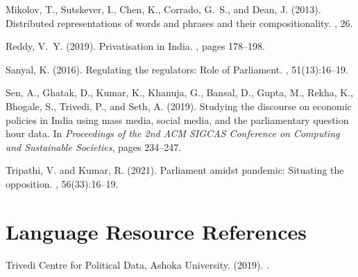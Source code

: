\documentclass[10pt, a4paper]{article}
\begin{document}
\begin{thebibliography}{}
Mikolov, T., Sutskever, I., Chen, K., Corrado, G.~S., and Dean, J.
\newblock (2013).
\newblock Distributed representations of words and phrases and their
  compositionality.
, 26.

Reddy, V.~Y.
\newblock (2019).
\newblock Privatisation in {India}.
, pages 178--198.

Sanyal, K.
\newblock (2016).
\newblock Regulating the regulators: Role of {Parliament}.
, 51(13):16--19.

Sen, A., Ghatak, D., Kumar, K., Khanuja, G., Bansal, D., Gupta, M., Rekha, K.,
  Bhogale, S., Trivedi, P., and Seth, A.
\newblock (2019).
\newblock Studying the discourse on economic policies in {India} using mass
  media, social media, and the parliamentary question hour data.
\newblock In {\em Proceedings of the 2nd ACM SIGCAS Conference on Computing and
  Sustainable Societies}, pages 234--247.

Tripathi, V. and Kumar, R.
\newblock (2021).
\newblock Parliament amidst pandemic: Situating the opposition.
, 56(33):16--19.

\end{thebibliography}

\section{Language Resource References}
\label{lr:ref}
\begin{thebibliography}{}

Trivedi Centre for Political Data, Ashoka University.
\newblock (2019).
.

\end{thebibliography}

    
\end{document}

